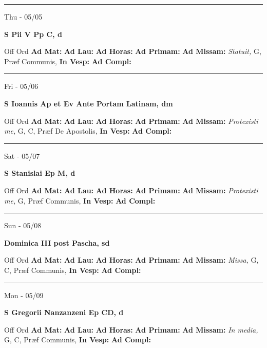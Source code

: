 \documentclass[letterpaper, 10pt]{article}
\begin{document}
\hrule
\begin{center}
Thu - 05/05
\end{center}\textbf{ \large S Pii V Pp C, \textnormal{\normalsize d}}
\begin{justify}
Off Ord
\textbf{Ad Mat: }
\textbf{Ad Lau: }
\textbf{Ad Horas: }
\textbf{Ad Primam: }
\textbf{Ad Missam:} \textit{Statuit, } G, Præf Communis, 
\textbf{In Vesp: }
\textbf{Ad Compl: }\end{justify}



\hrule
\begin{center}
Fri - 05/06
\end{center}\textbf{ \large S Ioannis Ap et Ev Ante Portam Latinam, \textnormal{\normalsize dm}}
\begin{justify}
Off Ord
\textbf{Ad Mat: }
\textbf{Ad Lau: }
\textbf{Ad Horas: }
\textbf{Ad Primam: }
\textbf{Ad Missam:} \textit{Protexisti me, } G, C, Præf De Apostolis, 
\textbf{In Vesp: }
\textbf{Ad Compl: }\end{justify}



\hrule
\begin{center}
Sat - 05/07
\end{center}\textbf{ \large S Stanislai Ep M, \textnormal{\normalsize d}}
\begin{justify}
Off Ord
\textbf{Ad Mat: }
\textbf{Ad Lau: }
\textbf{Ad Horas: }
\textbf{Ad Primam: }
\textbf{Ad Missam:} \textit{Protexisti me, } G, Præf Communis, 
\textbf{In Vesp: }
\textbf{Ad Compl: }\end{justify}



\hrule
\begin{center}
Sun - 05/08
\end{center}\textbf{ \large Dominica III post Pascha, \textnormal{\normalsize sd}}
\begin{justify}
Off Ord
\textbf{Ad Mat: }
\textbf{Ad Lau: }
\textbf{Ad Horas: }
\textbf{Ad Primam: }
\textbf{Ad Missam:} \textit{Missa, } G, C, Præf Communis, 
\textbf{In Vesp: }
\textbf{Ad Compl: }\end{justify}



\hrule
\begin{center}
Mon - 05/09
\end{center}\textbf{ \large S Gregorii Nanzanzeni Ep CD, \textnormal{\normalsize d}}
\begin{justify}
Off Ord
\textbf{Ad Mat: }
\textbf{Ad Lau: }
\textbf{Ad Horas: }
\textbf{Ad Primam: }
\textbf{Ad Missam:} \textit{In media, } G, C, Præf Communis, 
\textbf{In Vesp: }
\textbf{Ad Compl: }\end{justify}
\end{document}
